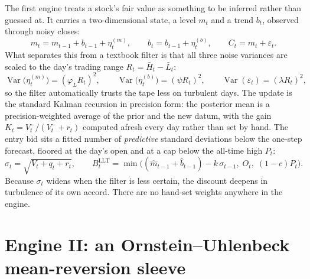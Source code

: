 \documentclass[11pt,a4paper]{article}
\begin{document}
The first engine treats a stock's fair value as something to be inferred
rather than guessed at. It carries a two-dimensional state, a level $m_t$ and
a trend $b_t$, observed through noisy closes:
\begin{equation}
m_t=m_{t-1}+b_{t-1}+\eta^{(m)}_t,\qquad
b_t=b_{t-1}+\eta^{(b)}_t,\qquad
C_t=m_t+\varepsilon_t .
\end{equation}
What separates this from a textbook filter is that all three noise variances
are scaled to the day's trading range $R_t=\bar H_t-\bar L_t$:
\begin{equation}
\operatorname{Var}\bigl(\eta^{(m)}_t\bigr)=(\varphi_L R_t)^2,\qquad
\operatorname{Var}\bigl(\eta^{(b)}_t\bigr)=(\psi R_t)^2,\qquad
\operatorname{Var}(\varepsilon_t)=(\lambda R_t)^2,
\end{equation}
so the filter automatically trusts the tape less on turbulent days. The
update is the standard Kalman recursion in precision form: the posterior
mean is a precision-weighted average of the prior and the new datum, with
the gain $K_t=V_t^-/(V_t^-+r_t)$ computed afresh every day rather than set
by hand. The entry bid sits a fitted number of \emph{predictive} standard
deviations below the one-step forecast, floored at the day's open and at a
cap below the all-time high $P_t$:
\begin{equation}
\sigma_t=\sqrt{V_t+q_t+r_t},\qquad
B_t^{\text{LLT}}=\min\bigl((\hat m_{t-1}+\hat b_{t-1})-k\,\sigma_{t-1},\;O_t,\;(1-c)P_t\bigr).
\end{equation}
Because $\sigma_t$ widens when the filter is less certain, the discount
deepens in turbulence of its own accord. There are no hand-set weights
anywhere in the engine.

\section{Engine II: an Ornstein--Uhlenbeck mean-reversion sleeve}
\end{document}

